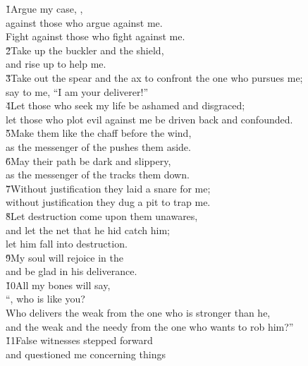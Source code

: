 \begin{poetry}
\poeml \v{1}Argue my case, , \\
\poemll    against those who argue against me. \\
\poemlll       Fight against those who fight against me. \\
\poeml \v{2}Take up the buckler and the shield, \\
\poemll    and rise up to help me. \\
\poeml \v{3}Take out the spear and the ax to confront the one who pursues me; \\
\poemll    say to me, ``I am your deliverer!'' \\
\poeml \v{4}Let those who seek my life be ashamed and disgraced; \\
\poemll    let those who plot evil against me be driven back and confounded. \\
\poeml \v{5}Make them like the chaff before the wind, \\
\poemll    as the messenger of the  pushes them aside. \\
\poeml \v{6}May their path be dark and slippery, \\
\poemll    as the messenger of the  tracks them down. \\
\poeml \v{7}Without justification they laid a snare for me; \\
\poemll    without justification they dug a pit to trap me. \\
\poeml \v{8}Let destruction come upon them unawares, \\
\poemll    and let the net that he hid catch him; \\
\poemlll       let him fall into destruction. \\
\poeml \v{9}My soul will rejoice in the  \\
\poemll    and be glad in his deliverance. \\
\poeml \v{10}All my bones will say, \\
\poemll    ``, who is like you? \\
\poeml Who delivers the weak from the one who is stronger than he, \\
\poemll    and the weak and the needy from the one who wants to rob him?'' \\
\poeml \v{11}False witnesses stepped forward \\
\poemll    and questioned me concerning things \\

\end{poetry}
